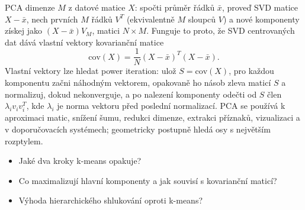 \begin{odpoved}
PCA dimenze $M$ z datové matice $X$: spočti průměr řádků $\bar x$, proveď SVD matice $X-\bar x$, nech prvních $M$ řádků $V^T$ (ekvivalentně $M$ sloupců $V$) a nové komponenty získej jako $(X-\bar x)V_M$, matici $N\times M$. Funguje to proto, že SVD centrovaných dat dává vlastní vektory kovarianční matice
\[
\mathrm{cov}(X)=\frac1N(X-\bar x)^T(X-\bar x).
\]
Vlastní vektory lze hledat power iteration: ulož $S=\mathrm{cov}(X)$, pro každou komponentu začni náhodným vektorem, opakovaně ho násob zleva maticí $S$ a normalizuj, dokud nekonverguje, a po nalezení komponenty odečti od $S$ člen $\lambda_iv_iv_i^T$, kde $\lambda_i$ je norma vektoru před poslední normalizací. PCA se používá k aproximaci matic, snížení šumu, redukci dimenze, extrakci příznaků, vizualizaci a v doporučovacích systémech; geometricky postupně hledá osy s největším rozptylem.
\end{odpoved}
\begin{recall}
\begin{itemize}[leftmargin=1.2em,itemsep=0pt,topsep=1pt]
  \item Jaké dva kroky k-means opakuje?
  \item Co maximalizují hlavní komponenty a jak souvisí s kovarianční maticí?
  \item Výhoda hierarchického shlukování oproti k-means?
\end{itemize}
\end{recall}
